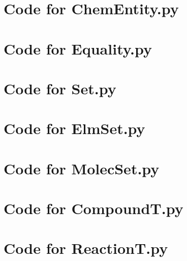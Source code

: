 \documentclass[12pt]{article}
\begin{document}
\noindent 

\newpage

\section{Code for ChemEntity.py}

\noindent 

\newpage

\section{Code for Equality.py}

\noindent 

\newpage

\section{Code for Set.py}

\noindent 

\newpage

\section{Code for ElmSet.py}

\noindent 

\newpage

\section{Code for MolecSet.py}

\noindent 

\newpage

\section{Code for CompoundT.py}

\noindent 

\newpage

\section{Code for ReactionT.py}

\noindent 
\end{document}
